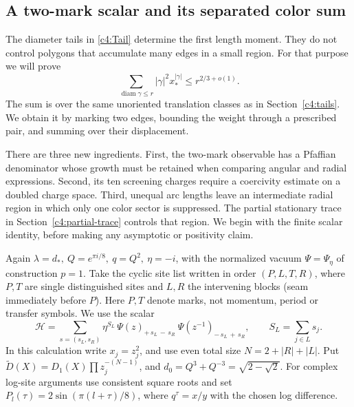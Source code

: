\subsection{A two-mark scalar and its separated color sum}\label{c4:two-mark}

The diameter tails in \eqref{c4:Tail} determine the first length moment.
They do not control polygons that accumulate many edges in a small region.
For that purpose we will prove
\[
 \sum_{\operatorname{diam}\gamma\le r}|\gamma|^2x_*^{|\gamma|}
       \le r^{2/3+o(1)}.
\]
The sum is over the same unoriented translation classes as in
Section~\ref{c4:tails}.  We obtain it by marking two edges, bounding the
weight through a prescribed pair, and summing over their displacement.

There are three new ingredients.  First, the two-mark observable has a
Pfaffian denominator whose growth must be retained when comparing angular
and radial expressions.  Second, its ten screening charges require a
coercivity estimate on a doubled charge space.  Third, unequal arc lengths
leave an intermediate radial region in which only one color sector is
suppressed.  The partial stationary trace in
Section~\ref{c4:partial-trace} controls that region.  We begin with the
finite scalar identity, before making any asymptotic or positivity claim.


Again \(\lambda=d_*,\ Q=e^{\pi i/8},\ q=Q^2,\ \eta=-i\), with the normalized vacuum \(\Psi=\Psi_\eta\) of construction \(p=1\). Take the cyclic site list written in order \((P,L,T,R)\), where \(P,T\) are single distinguished sites and \(L,R\) the intervening blocks (seam immediately before \(P\)). Here \(P,T\) denote marks, not momentum, period or transfer symbols. We use the scalar
\[
 \mathscr H=
 \sum_{s=(s_L,s_R)} \eta^{S_L}\,
       \Psi(z)_{+\,s_L\,-\,s_R}\ \Psi(z^{-1})_{-\,s_L\,+\,s_R},
       \qquad S_L=\sum_{j\in L}s_j .
\]
In this calculation write \(x_j=z_j^2\), and use even total size \(N=2+|R|+|L|\). Put
\(\widetilde D(X)=D_1(X)\prod z_j^{-(N-1)}\), and \(d_0=Q^3+Q^{-3}=\sqrt{2-\sqrt2}\).
For complex log-site arguments use consistent square roots and set
\(P_l(\tau)=2\sin(\pi(l+\tau)/8)\), where \(q^\tau=x/y\) with the chosen log difference.

